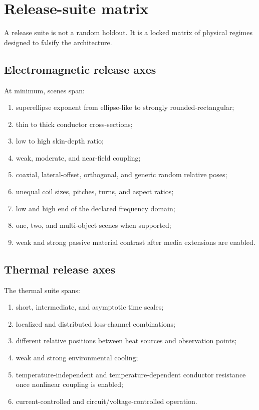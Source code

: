 \section{Release-suite matrix}
\label{sec:release-matrix}

A release suite is not a random holdout. It is a locked matrix of physical
regimes designed to falsify the architecture.

\subsection{Electromagnetic release axes}

At minimum, scenes span:
\begin{enumerate}
\item superellipse exponent from ellipse-like to strongly rounded-rectangular;
\item thin to thick conductor cross-sections;
\item low to high skin-depth ratio;
\item weak, moderate, and near-field coupling;
\item coaxial, lateral-offset, orthogonal, and generic random relative poses;
\item unequal coil sizes, pitches, turns, and aspect ratios;
\item low and high end of the declared frequency domain;
\item one, two, and multi-object scenes when supported;
\item weak and strong passive material contrast after media extensions are
      enabled.
\end{enumerate}

\subsection{Thermal release axes}

The thermal suite spans:
\begin{enumerate}
\item short, intermediate, and asymptotic time scales;
\item localized and distributed loss-channel combinations;
\item different relative positions between heat sources and observation points;
\item weak and strong environmental cooling;
\item temperature-independent and temperature-dependent conductor resistance
      once nonlinear coupling is enabled;
\item current-controlled and circuit/voltage-controlled operation.
\end{enumerate}

